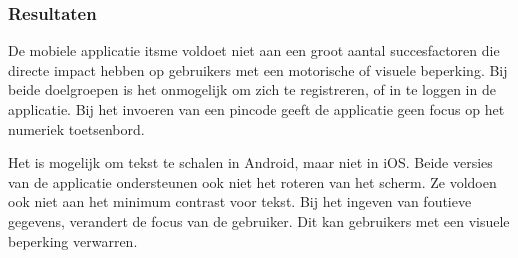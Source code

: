 \subsubsection{Resultaten}
De mobiele applicatie itsme voldoet niet aan een groot aantal succesfactoren die directe impact hebben op gebruikers met een motorische of visuele beperking. Bij beide doelgroepen is het onmogelijk om zich te registreren, of in te loggen in de applicatie. Bij het invoeren van een pincode geeft de applicatie geen focus op het numeriek toetsenbord.

Het is mogelijk om tekst te schalen in Android, maar niet in iOS. Beide versies van de applicatie ondersteunen ook niet het roteren van het scherm. Ze voldoen ook niet aan het minimum contrast voor tekst. Bij het ingeven van foutieve gegevens, verandert de focus van de gebruiker. Dit kan gebruikers met een visuele beperking verwarren. 

